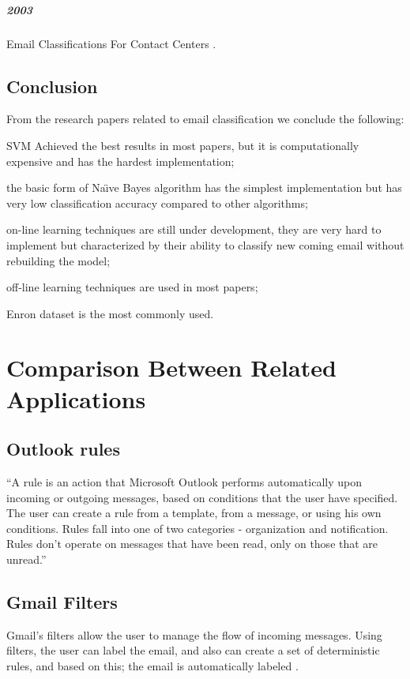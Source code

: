 \subparagraph*{2003}
\begin{my_itemize}
  \item Email Classifications For Contact Centers \cite{ANI03}.
\end{my_itemize}


\subsection{Conclusion}
From the research papers related to email classification we conclude the following:
\begin{my_itemize}
    \item SVM Achieved the best results in most papers, but it is computationally 
    expensive and has the hardest implementation;
    \item the basic form of Na\"{\i}ve Bayes algorithm has the simplest implementation 
    but has very low classification accuracy compared to other algorithms;
    \item on-line learning techniques are still under development, they are very 
    hard to implement but characterized by their ability to classify new coming 
    email without rebuilding the model;
    \item off-line learning techniques are used in most papers;
    \item Enron dataset \cite{ENRON} is the most commonly used.
\end{my_itemize}
\section{Comparison Between Related Applications}
\label{sec:related_apps}

\subsection{Outlook rules}
``A rule is an action that Microsoft Outlook performs automatically upon incoming or outgoing 
messages, based on conditions that the user have specified. The user can create a rule 
from a template, from a message, or using his own conditions. Rules fall into one of 
two categories - organization and notification. Rules don't operate on messages that 
have been read, only on those that are unread.'' \cite{OUTLOOK_REF}

\subsection{Gmail Filters}
Gmail's filters allow the user to manage the flow of incoming messages. Using filters, 
the user can label the email, and also can create a set of deterministic rules, and 
based on this; the email is automatically labeled \cite{GMAIL_FILTERS}.

